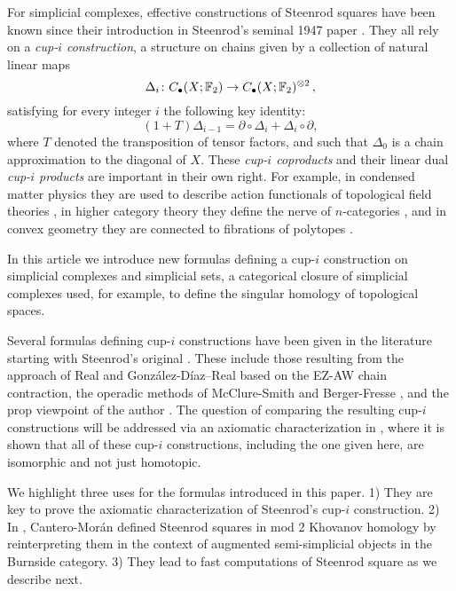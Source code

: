 For simplicial complexes, effective constructions of Steenrod squares have been known since their introduction in Steenrod's seminal 1947 paper \cite{steenrod1947products}.
They all rely on a \textit{cup-$i$ construction}, a structure on chains given by a collection of natural linear maps
\begin{equation*}
\Delta_i \colon C_\bullet(X; {\mathbb{F}_2})  \to C_\bullet(X; {\mathbb{F}_2})^{\otimes 2}\,,
\end{equation*}
satisfying for every integer $i$ the following key identity:
\begin{equation*}
(1+T) \Delta_{i-1} =
\partial \circ \Delta_i + \Delta_i \circ \partial,
\end{equation*}
where $T$ denoted the transposition of tensor factors,
and such that $\Delta_0$ is a chain approximation to the diagonal of $X$.
These \textit{cup-$i$ coproducts} and their linear dual \textit{cup-$i$ products} are important in their own right.
For example, in condensed matter physics they are used to describe action functionals of topological field theories \cite{gaiotto2016spin, kapustin2017fermionic, barkeshli2021classification}, in higher category theory they define the nerve of $n$-categories \cite{medina2020globular}, and in convex geometry they are connected to fibrations of polytopes \cite{kapranov1991polycategory, medina2022fib_poly}.

In this article we introduce new formulas defining a cup-$i$ construction on simplicial complexes and simplicial sets, a categorical closure of simplicial complexes used, for example, to define the singular homology of topological spaces.

Several formulas defining cup-$i$ constructions have been given in the literature starting with Steenrod's original \cite{steenrod1947products}.
These include those resulting from the approach of Real \cite{real1996computability} and Gonz\'alez-D\'iaz--Real \cite{gonzalez-diaz1999steenrod, gonzalez2003computation, gonzalez-diaz2005cocyclic} based on the EZ-AW chain contraction, the operadic methods of McClure-Smith \cite{mcclure2003multivariable} and Berger-Fresse \cite{berger2004combinatorial}, and the prop viewpoint of the author \cite{medina2020prop1, medina2021prop2}.
The question of comparing the resulting cup-$i$ constructions will be addressed via an axiomatic characterization in \cite{medina2018axiomatic}, where it is shown that all of these cup-$i$ constructions, including the one given here, are isomorphic and not just homotopic.

We highlight three uses for the formulas introduced in this paper.
1) They are key to prove the axiomatic characterization of Steenrod's cup-$i$ construction.
2) In \cite{cantero-moran2020khovanov}, Cantero-Mor\'an defined Steenrod squares in mod 2 Khovanov homology \cite{khovanov2000categorification} by reinterpreting them in the context of augmented semi-simplicial objects in the Burnside category.
3) They lead to fast computations of Steenrod square as we describe next.

